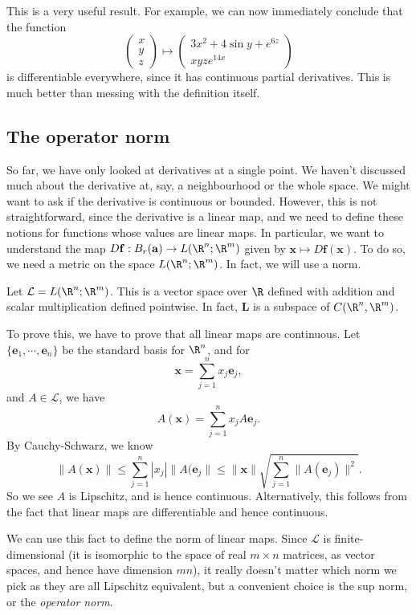 \documentclass[a4paper]{article}
\begin{document}
This is a very useful result. For example, we can now immediately conclude that the function
\[
  \begin{pmatrix}
    x\\y\\z
  \end{pmatrix}
  \mapsto
  \begin{pmatrix}
    3x^2 + 4\sin y + e^{6z}\\
    xyze^{14x}
  \end{pmatrix}
\]
is differentiable everywhere, since it has continuous partial derivatives. This is much better than messing with the definition itself.

\subsection{The operator norm}
So far, we have only looked at derivatives at a single point. We haven't discussed much about the derivative at, say, a neighbourhood or the whole space. We might want to ask if the derivative is continuous or bounded. However, this is not straightforward, since the derivative is a linear map, and we need to define these notions for functions whose values are linear maps. In particular, we want to understand the map $D\mathbf{f}: B_r(\mathbf{a}) \to L(\R^n; \R^m)$ given by $\mathbf{x} \mapsto D \mathbf{f}(\mathbf{x})$. To do so, we need a metric on the space $L(\R^n; \R^m)$. In fact, we will use a norm.

Let $\mathcal{L} = L(\R^n; \R^m)$. This is a vector space over $\R$ defined with addition and scalar multiplication defined pointwise. In fact, $\mathbf{L}$ is a subspace of $C(\R^n, \R^m)$.

To prove this, we have to prove that all linear maps are continuous. Let $\{\mathbf{e}_1, \cdots, \mathbf{e}_n\}$ be the standard basis for $\R^n$, and for
\[
  \mathbf{x} = \sum_{j = 1}^n x_j \mathbf{e}_j,
\]
and $A \in \mathcal{L}$, we have
\[
  A (\mathbf{x}) = \sum_{j = 1}^n x_j A \mathbf{e}_j.
\]
By Cauchy-Schwarz, we know
\[
  \|A(\mathbf{x})\| \leq \sum_{j = 1}^n |x_j| \|A(\mathbf{e}_j\| \leq \|\mathbf{x}\| \sqrt{\sum_{j = 1}^n \|A (\mathbf{e}_j)\|^2}.
\]
So we see $A$ is Lipschitz, and is hence continuous. Alternatively, this follows from the fact that linear maps are differentiable and hence continuous.

We can use this fact to define the norm of linear maps. Since $\mathcal{L}$ is finite-dimensional (it is isomorphic to the space of real $m\times n$ matrices, as vector spaces, and hence have dimension $mn$), it really doesn't matter which norm we pick as they are all Lipschitz equivalent, but a convenient choice is the sup norm, or the \emph{operator norm}.
\end{document}
